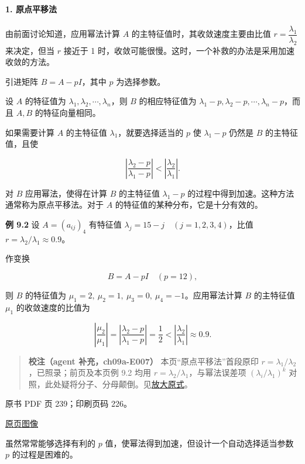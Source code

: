 \paragraph{1. 原点平移法}\label{ch09a-ux539fux70b9ux5e73ux79fbux6cd5}

由前面讨论知道，应用幂法计算 \(A\) 的主特征值时，其收敛速度主要由比值 \(r=\dfrac{\lambda_1}{\lambda_2}\) 来决定，但当 \(r\) 接近于 1 时，收敛可能很慢。这时，一个补救的办法是采用加速收敛的方法。

引进矩阵 \(B=A-pI\)，其中 \(p\) 为选择参数。

设 \(A\) 的特征值为 \(\lambda_1,\lambda_2,\cdots,\lambda_n\)，则 \(B\) 的相应特征值为 \(\lambda_1-p,\lambda_2-p,\cdots,\lambda_n-p\)，而且 \(A,B\) 的特征向量相同。

如果需要计算 \(A\) 的主特征值 \(\lambda_1\)，就要选择适当的 \(p\) 使 \(\lambda_1-p\) 仍然是 \(B\) 的主特征值，且使

\[
\left|\frac{\lambda_2-p}{\lambda_1-p}\right|<\left|\frac{\lambda_2}{\lambda_1}\right|.
\]

对 \(B\) 应用幂法，使得在计算 \(B\) 的主特征值 \(\lambda_1-p\) 的过程中得到加速。这种方法通常称为原点平移法。对于 \(A\) 的特征值的某种分布，它是十分有效的。

\textbf{例 9.2} 设 \(A=(a_{ij})_4\) 有特征值 \(\lambda_j=15-j\quad(j=1,2,3,4)\)，比值 \(r=\lambda_2/\lambda_1\approx0.9\)。

作变换

\[
B=A-pI\quad(p=12),
\]

则 \(B\) 的特征值为 \(\mu_1=2,\ \mu_2=1,\ \mu_3=0,\ \mu_4=-1\)。应用幂法计算 \(B\) 的主特征值 \(\mu_1\) 的收敛速度的比值为

\[
\left|\frac{\mu_2}{\mu_1}\right|=\left|\frac{\lambda_2-p}{\lambda_1-p}\right|=\frac12<\left|\frac{\lambda_2}{\lambda_1}\right|\approx0.9.
\]

\begin{quote}
\textbf{校注（agent 补充，ch09a-E007）} 本页``原点平移法''首段原印 \(r=\lambda_1/\lambda_2\)，已照录；前页及本页例 9.2 均用 \(r=\lambda_2/\lambda_1\)，与幂法误差项 \((\lambda_i/\lambda_1)^k\) 对照，此处疑将分子、分母颠倒。见\href{verified/assets/ch09a/review-p238-ratio.png}{放大原式}。
\end{quote}

\clearpage

原书 PDF 页 239；印刷页码 226。

\href{source-images/pdf-239.jpeg}{原页图像}

虽然常常能够选择有利的 \(p\) 值，使幂法得到加速，但设计一个自动选择适当参数 \(p\) 的过程是困难的。

